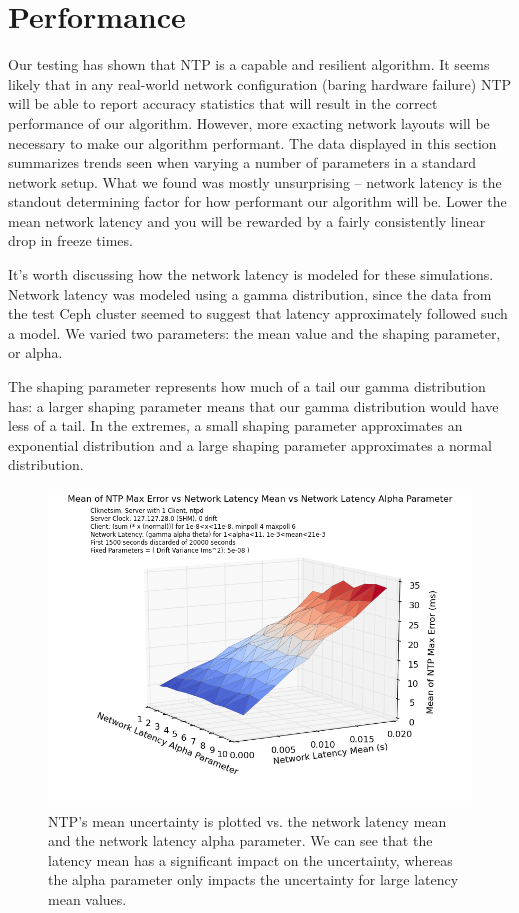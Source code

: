\section{Performance}

Our testing has shown that NTP is a capable and resilient
algorithm. It seems likely that in any real-world network
configuration (baring hardware failure) NTP will be able to report
accuracy statistics that will result in the correct performance of our
algorithm. However, more exacting network layouts will be necessary to
make our algorithm performant. The data displayed in this section
summarizes trends seen when varying a number of parameters in a
standard network setup. What we found was mostly unsurprising --
network latency is the standout determining factor for how performant
our algorithm will be. Lower the mean network latency and you will be
rewarded by a fairly consistently linear drop in freeze times.

It's worth discussing how the network latency is modeled for these
simulations. Network latency was modeled using a gamma distribution,
since the data from the test Ceph cluster seemed to suggest that
latency approximately followed such a model. We varied two parameters:
the mean value and the shaping parameter, or alpha.

The shaping parameter represents how much of a tail our gamma
distribution has: a larger shaping parameter means that our gamma
distribution would have less of a tail. In the extremes, a small
shaping parameter approximates an exponential distribution and a large
shaping parameter approximates a normal distribution.


\begin{figure}[h]
  \caption{NTP's mean uncertainty is plotted vs. the network latency mean and the network latency alpha parameter. We can see that the latency mean has a significant impact on the uncertainty, whereas the alpha parameter only impacts the uncertainty for large latency mean values.}
  \label{fig:mean-uncertainty_latency-mean_latency-alpha}
  \includegraphics[width=0.8\linewidth]{mean_max_error-mean_latency-latency_alpha.png}
\end{figure}

